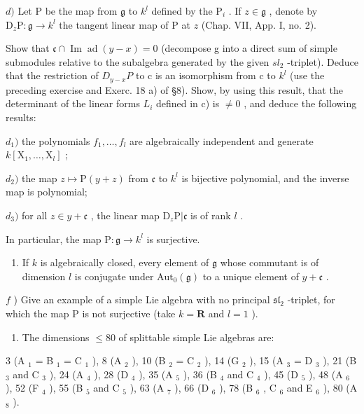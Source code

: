 \(d)\) Let \(\mathrm{P}\) be the map from \(\mathfrak{g}\) to \(k^l\) defined by the \(\mathrm{P}_i\) . If \(z \in \mathfrak{g}\) , denote by \(\mathrm{D}_z\mathrm{P} : \mathfrak{g} \to k^l\) the tangent linear map of \(\mathrm{P}\) at \(z\) (Chap. VII, App. I, no. 2).

Show that \(\mathfrak{c}\cap\operatorname{Im}\operatorname{ad}(y-x)=0\) (decompose g into a direct sum of simple submodules relative to the subalgebra generated by the given \(sl_{2}\) -triplet). Deduce that the restriction of \(D_{y-x}P\) to c is an isomorphism from c to \(k^{l}\) (use the preceding exercise and Exerc. 18 a) of §8). Show, by using this result, that the determinant of the linear forms \(L_{i}\) defined in c) is \(\neq0\) , and deduce the following results:

\(d_{1})\) the polynomials \(f_{1},\ldots ,f_{l}\) are algebraically independent and generate \(k[\mathrm{X}_1,\dots ,\mathrm{X}_l]\) ;

\(d_{2})\) the map \(z \mapsto \mathrm{P}(y + z)\) from \(\mathfrak{c}\) to \(k^{l}\) is bijective polynomial, and the inverse map is polynomial;

\(d_{3})\) for all \(z\in y + \mathfrak{c}\) , the linear map \(\mathrm{D}_z\mathrm{P}|\mathfrak{c}\) is of rank \(l\) .

In particular, the map \(\mathrm{P}:\mathfrak{g}\to k^l\) is surjective.

\begin{enumerate}
\def\labelenumi{\alph{enumi})}
\setcounter{enumi}{4}
\tightlist
\item
  If \(k\) is algebraically closed, every element of \(\mathfrak{g}\) whose commutant is of dimension \(l\) is conjugate under \(\mathrm{Aut}_0(\mathfrak{g})\) to a unique element of \(y + \mathfrak{c}\) .
\end{enumerate}

\(f\) ) Give an example of a simple Lie algebra with no principal \(\mathfrak{sl}_2\) -triplet, for which the map \(\mathrm{P}\) is not surjective (take \(k = \mathbf{R}\) and \(l = 1\) ).


\begin{enumerate}
\def\labelenumi{\arabic{enumi})}
\tightlist
\item
  The dimensions \(\leq 80\) of splittable simple Lie algebras are:
\end{enumerate}

3 (A \(_{1}\) = B \(_{1}\) = C \(_{1}\) ), 8 (A \(_{2}\) ), 10 (B \(_{2}\) = C \(_{2}\) ), 14 (G \(_{2}\) ), 15 (A \(_{3}\) = D \(_{3}\) ), 21 (B \(_{3}\) and C \(_{3}\) ), 24 (A \(_{4}\) ), 28 (D \(_{4}\) ), 35 (A \(_{5}\) ), 36 (B \(_{4}\) and C \(_{4}\) ), 45 (D \(_{5}\) ), 48 (A \(_{6}\) ), 52 (F \(_{4}\) ), 55 (B \(_{5}\) and C \(_{5}\) ), 63 (A \(_{7}\) ), 66 (D \(_{6}\) ), 78 (B \(_{6}\) , C \(_{6}\) and E \(_{6}\) ), 80 (A \(_{8}\) ).

